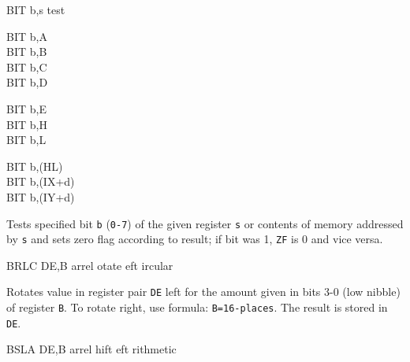 \begin{basedescript}{
	\desclabelstyle{\multilinelabel}
	\desclabelwidth{3cm}}
	\pagebreak
	\begin{DetailItem}{BIT b,s}
		{test }
		{}

		\begin{DetailVariants}
			BIT b,A\\
			BIT b,B\\
			BIT b,C\\
			BIT b,D

			\columnbreak
			BIT b,E\\
			BIT b,H\\
			BIT b,L
			
			\columnbreak
			BIT b,(HL)\\
			BIT b,(IX+d)\\
			BIT b,(IY+d)
		\end{DetailVariants}

		Tests specified bit {\tt b} ({\tt 0-7}) of the given register {\tt s} or contents of memory addressed by {\tt s} and sets zero flag according to result; if bit was 1, {\tt ZF} is 0 and vice versa.

		\begin{DetailEffects}
			\FlagsBITr
		\end{DetailEffects}

		\begin{DetailTiming}
			\DetailTime[b,r]{2}{8}
			\DetailTime[b,(HL)]{3}{12}
			\DetailTime[b,(IX+d)]{5}{20}
			\DetailTime[b,(IY+d)]{5}{20}
		\end{DetailTiming}

	\end{DetailItem}

	\begin{DetailItem}{BRLC DE,B\ZXN}
		{arrel otate eft ircular}
		{\SymBRLC}

		Rotates value in register pair {\tt DE} left for the amount given in bits 3-0 (low nibble) of register {\tt B}. To rotate right, use formula: {\tt B=16-places}. The result is stored in {\tt DE}.

		\begin{DetailEffects}
			\FlagsBRLC
		\end{DetailEffects}

		\begin{DetailTiming}
			\DetailTime{2}{8}
		\end{DetailTiming}

	\end{DetailItem}

	\begin{DetailItem}{BSLA DE,B\ZXN}
		{arrel hift eft rithmetic}
		{\SymBSLA}


\end{DetailItem}
\end{basedescript}
